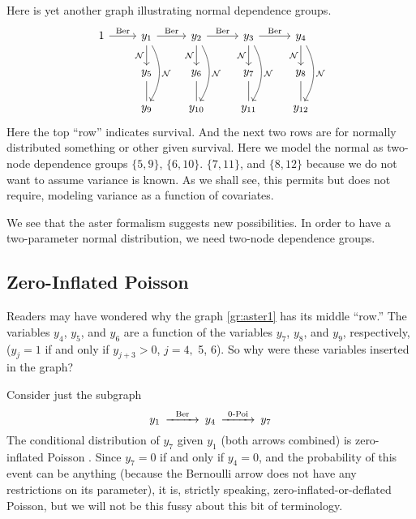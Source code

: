 Here is yet another graph illustrating normal dependence groups.
\begin{equation} \label{gr:normal}
\begin{tikzcd}
   1
   \arrow{r}{\text{Ber}}
   & y_1
   \arrow{d}[swap]{\mathcal{N}}
   \arrow[bend left]{dd}{\mathcal{N}}
   \arrow{r}{\text{Ber}}
   & y_2
   \arrow{d}[swap]{\mathcal{N}}
   \arrow[bend left]{dd}{\mathcal{N}}
   \arrow{r}{\text{Ber}}
   & y_3
   \arrow{d}[swap]{\mathcal{N}}
   \arrow[bend left]{dd}{\mathcal{N}}
   \arrow{r}{\text{Ber}}
   & y_4
   \arrow{d}[swap]{\mathcal{N}}
   \arrow[bend left]{dd}{\mathcal{N}}
   \\
   \hphantom{1}
   & y_5 \arrow[dash]{d}
   & y_6 \arrow[dash]{d}
   & y_7 \arrow[dash]{d}
   & y_8 \arrow[dash]{d}
   \\
   \hphantom{1} & y_9 & y_{10} & y_{11} & y_{12}
\end{tikzcd}
\end{equation}
Here the top ``row'' indicates survival.  And the next two rows are
for normally distributed something or other given survival.  Here we
model the normal as two-node dependence groups
$\{ 5, 9 \}$,
$\{ 6, 10 \}$.
$\{ 7, 11 \}$, and
$\{ 8, 12 \}$ because
we do not want to assume variance is known.  As we shall see, this permits
but does not require, modeling variance as a function of covariates.

We see that the aster formalism suggests new possibilities.  In order to
have a two-parameter normal distribution, we need two-node dependence groups.

\subsection{Zero-Inflated Poisson}
\label{sec:zero-inflated}

Readers may have wondered why the graph \eqref{gr:aster1}
has its middle ``row.''  The variables $y_4$, $y_5$, and $y_6$ are a function
of the variables $y_7$, $y_8$, and $y_9$, respectively,
($y_j = 1$ if and only if $y_{j + 3} > 0$, $j = 4,$ 5, 6).
So why were these variables inserted in the graph?

Consider just the subgraph
\begin{equation} \label{gr:zero-inflated-poisson}
\begin{CD}
   y_1 @>\text{Ber}>> y_4 @>\text{0-Poi}>> y_7
\end{CD}
\end{equation}
The conditional distribution of $y_7$ given $y_1$ (both arrows combined)
is zero-inflated Poisson \citep{lambert}.
Since $y_7 = 0$ if and only if $y_4 = 0$, and the probability of this event
can be anything
(because the Bernoulli arrow does not have any restrictions on its parameter),
it is, strictly speaking, zero-inflated-or-deflated Poisson, but we will not
be this fussy about this bit of terminology.

